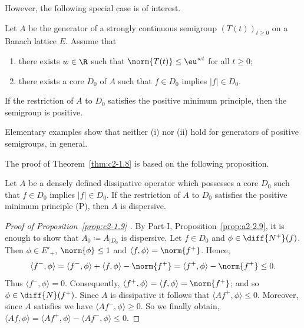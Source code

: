 However, the following special case is of interest.
\begin{theorem}\label{thm:c2-1.8}
%
Let $A$ be the generator of a strongly continuous semigroup $(T(t))_{t \geq 0}$ on a Banach lattice $E$.
Assume that
\begin{enumerate}[\upshape (i)]
\item \label{thm:c2-1.8-1}
there exists $w \in \R$ such that $\norm{T(t)} \leq \eu^{wt}$ for all $t \geq 0$;
\item \label{thm:c2-1.8-2}
there exists a core $D_{0}$ of\/ $A$ such that $f \in D_{0}$ implies $|f| \in D_{0}$.
\end{enumerate}
If the restriction of\/ $A$ to $D_{0}$ satisfies the positive minimum principle, then the semigroup is positive.
\end{theorem}
\begin{remark*}\label{rem:c2-1.8-Claude}
%
Elementary examples show that neither \upshape(i) nor \upshape(ii) hold for generators of positive semigroups, in general.
\end{remark*}
The proof of Theorem~\ref{thm:c2-1.8}   is based on the following proposition.
\begin{proposition}\label{prop:c2-1.9}
%
Let $A$ be a densely defined dissipative operator which possesses a core $D_{0}$ such that $f \in D_{0}$ implies $|f| \in D_{0}$.
If the restriction of\/ $A$ to $D_{0}$ satisfies the positive minimum principle (P), then $A$ is dispersive.
\end{proposition}
\begin{proof}[Proof of Proposition~\ref{prop:c2-1.9}  ]
By Part-I, Proposition~\ref{prop:a2-2.9}, it is enough to show that $A_{0} \coloneqq A_{\vert D_{0}}$ is dispersive.
Let $f \in D_{0}$ and $\phi \in \diff{N^{+}}(f)$.
Then $\phi \in E'_{+}$, $\norm{\phi} \leq 1$ and $\langle f,\phi \rangle = \norm{f^{+}}$.
Hence, 
%
\[
	\langle f^{-},\phi \rangle = \langle f^{-},\phi \rangle + \langle f,\phi \rangle - \norm{f^{+}} = \langle f^{+},\phi \rangle - \norm{f^{+}} \leq 0 .
\]
%
Thus $\langle f^{-},\phi \rangle = 0$.
Consequently, $\langle f^{+},\phi \rangle = \langle f,\phi \rangle = \norm{f^{+}}$; and so $\phi \in \diff{N}(f^{+})$.
Since $A$ is dissipative it follows that $\langle Af^{+},\phi \rangle \leq 0$.
Moreover, since $A$ satisfies  we have $\langle Af^{-},\phi \rangle \geq 0$.
So we finally obtain, $\langle Af,\phi \rangle = \langle Af^{+},\phi \rangle - \langle Af^{-},\phi \rangle \leq 0$.
\end{proof}
